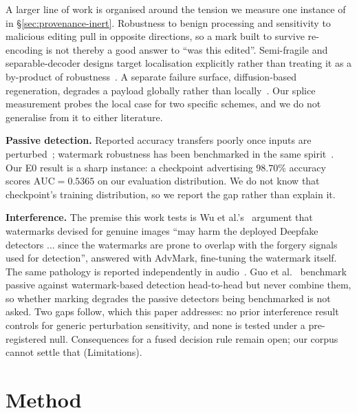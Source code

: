 \documentclass[journal]{IEEEtran}
\begin{document}
A larger line of work is organised around the tension we measure one
instance of in \S\ref{sec:provenance-inert}. Robustness to benign processing
and sensitivity to malicious editing pull in opposite directions, so a mark
built to survive re-encoding is not thereby a good answer to ``was this
edited''. Semi-fragile and separable-decoder designs target localisation
explicitly rather than treating it as a by-product of
robustness~\cite{wu2023sepmark,wang2025fractalforensics,wang2024lampmark,zhang2024editguard,zhang2025omniguard,he2025waveguard,sun2025diffmark,che2026gifguard}.
A separate failure surface, diffusion-based regeneration, degrades a payload
globally rather than
locally~\cite{zhang2024zodiac,ni2025diffusionbreaks,qi2026editingaway}. Our
splice measurement probes the local case for two specific schemes, and we do
not generalise from it to either literature.

\textbf{Passive detection.} Reported accuracy transfers poorly once inputs are
perturbed~\cite{hopf2026ntire}; watermark robustness has been benchmarked in
the same spirit~\cite{an2024waves}. Our E0 result is a sharp instance: a
checkpoint advertising $98.70\%$ accuracy scores $\mathrm{AUC}=0.5365$ on our
evaluation distribution. We do not know that checkpoint's training
distribution, so we report the gap rather than explain it.

\textbf{Interference.} The premise this work tests is Wu et
al.'s~\cite{wu2024watermarksbugs} argument that watermarks devised for genuine
images ``may harm the deployed Deepfake detectors ... since the watermarks are
prone to overlap with the forgery signals used for detection'', answered with
AdvMark, fine-tuning the watermark itself. The same pathology is reported
independently in audio~\cite{muller2026watermarkshortcut}. Guo et
al.~\cite{guo2024passiveorwatermark} benchmark passive against watermark-based
detection head-to-head but never combine them, so whether marking degrades the
passive detectors being benchmarked is not asked. Two gaps follow, which this
paper addresses: no prior interference result controls for generic
perturbation sensitivity, and none is tested under a pre-registered null.
Consequences for a fused decision rule remain open; our corpus cannot settle
that (Limitations).

\section{Method}
\label{sec:method}
\end{document}
